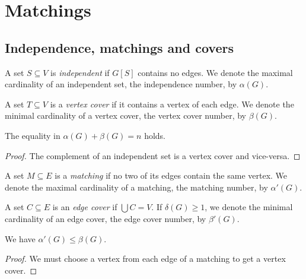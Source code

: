 \section{Matchings}

\subsection{Independence, matchings and covers}


\begin{definicija}
A set $S \subseteq V$ is \emph{independent}
if $G[S]$ contains no edges. We denote the maximal cardinality of
an independent set, the independence number, by $\alpha(G)$.
\end{definicija}

\begin{definicija}
A set $T \subseteq V$ is a \emph{vertex cover}
if it contains a vertex of each edge. We denote the minimal
cardinality of a vertex cover, the vertex cover number, by
$\beta(G)$.
\end{definicija}

\begin{trditev}
The equality in $\alpha(G) + \beta(G) = n$ holds.
\end{trditev}

\begin{proof}
The complement of an independent set is a vertex cover and
vice-versa.
\end{proof}

\begin{definicija}
A set $M \subseteq E$ is a \emph{matching} if no
two of its edges contain the same vertex. We denote the maximal
cardinality of a matching, the matching number, by $\alpha'(G)$.
\end{definicija}

\begin{definicija}
A set $C \subseteq E$ is an \emph{edge cover} if
$\bigcup C = V$. If $\delta(G) \geq 1$, we denote the minimal
cardinality of an edge cover, the edge cover number, by
$\beta'(G)$.
\end{definicija}

\begin{trditev}
We have $\alpha'(G) \leq \beta(G)$.
\end{trditev}

\begin{proof}
We must choose a vertex from each edge of a matching to get a
vertex cover.
\end{proof}

